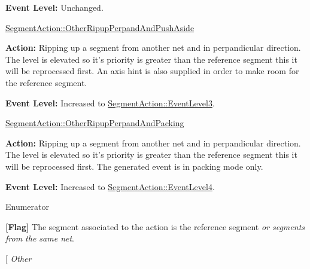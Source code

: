 \begin{DoxyItemize}
 {\bfseries Event Level\-:} Unchanged.
\item \hyperlink{classKite_1_1SegmentAction_a1d1cfd8ffb84e947f82999c682b666a7ad9caf9375b714a403e4af8a142cf9991}{Segment\-Action\-::\-Other\-Ripup\-Perpand\-And\-Push\-Aside}\par
 {\bfseries Action\-:} Ripping up a segment from another net and in perpandicular direction. The level is elevated so it's priority is greater than the reference segment this it will be reprocessed first. An axis hint is also supplied in order to make room for the reference segment.\par
 {\bfseries Event Level\-:} Increased to \hyperlink{classKite_1_1SegmentAction_a1d1cfd8ffb84e947f82999c682b666a7a11ef388ea422168a9c79fd9b4d81ea34}{Segment\-Action\-::\-Event\-Level3}.
\item \hyperlink{classKite_1_1SegmentAction_a1d1cfd8ffb84e947f82999c682b666a7aed50f579a9e6b7ac698b2edf1a5da5c8}{Segment\-Action\-::\-Other\-Ripup\-Perpand\-And\-Packing}\par
 {\bfseries Action\-:} Ripping up a segment from another net and in perpandicular direction. The level is elevated so it's priority is greater than the reference segment this it will be reprocessed first. The generated event is in packing mode only.\par
 {\bfseries Event Level\-:} Increased to \hyperlink{classKite_1_1SegmentAction_a1d1cfd8ffb84e947f82999c682b666a7ab8346062d5bbccb98893c4675b8d5098}{Segment\-Action\-::\-Event\-Level4}. 
\end{DoxyItemize}\begin{Desc}
\item[Enumerator]\par
\begin{description}
\item[{\em 
\hypertarget{classKite_1_1SegmentAction_a1d1cfd8ffb84e947f82999c682b666a7aacd3ef9d889b306ca7e7bdcd37ba659a}{Self}\label{classKite_1_1SegmentAction_a1d1cfd8ffb84e947f82999c682b666a7aacd3ef9d889b306ca7e7bdcd37ba659a}
}]{\bfseries \mbox{[}Flag\mbox{]}} The segment associated to the action is the reference segment {\itshape or segments from the same net}. \item[{\em 
\hypertarget{classKite_1_1SegmentAction_a1d1cfd8ffb84e947f82999c682b666a7a75f0c3176be2226dfe8ad164a0a034a2}{Other}\label{classKite_1_1SegmentAction_a1d1cfd8ffb84e947f82999c682b666a7a75f0c3176be2226dfe8ad164a0a034a2}
}
\end{description}
\end{Desc}
